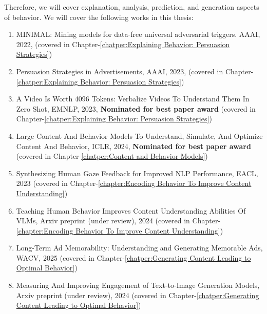 Therefore, we will cover explanation, analysis, prediction, and generation aspects of behavior. We will cover the following works in this thesis:
\begin{enumerate}
    \item MINIMAL: Mining models for data-free universal adversarial triggers. AAAI, 2022, (covered in Chapter-\ref{chatper:Explaining Behavior: Persuasion Strategies})

    \item Persuasion Strategies in Advertisements, AAAI, 2023, (covered in Chapter-\ref{chatper:Explaining Behavior: Persuasion Strategies})

    \item A Video Is Worth 4096 Tokens: Verbalize Videos To Understand Them In Zero Shot, EMNLP, 2023, \textbf{Nominated for best paper award} (covered in Chapter-\ref{chatper:Explaining Behavior: Persuasion Strategies})

    \item Large Content And Behavior Models To Understand, Simulate, And Optimize Content And Behavior, ICLR, 2024, \textbf{Nominated for best paper award} (covered in Chapter-\ref{chatper:Content and Behavior Models})
    
    \item Synthesizing Human Gaze Feedback for Improved NLP Performance, EACL, 2023 (covered in Chapter-\ref{chapter:Encoding Behavior To Improve Content Understanding})

    \item Teaching Human Behavior Improves Content Understanding Abilities Of VLMs, Arxiv preprint (under review), 2024 (covered in Chapter-\ref{chapter:Encoding Behavior To Improve Content Understanding})

    \item Long-Term Ad Memorability: Understanding and Generating Memorable Ads, WACV, 2025 (covered in Chapter-\ref{chatper:Generating Content Leading to Optimal Behavior})

    \item Measuring And Improving Engagement of Text-to-Image Generation Models, Arxiv preprint (under review), 2024 (covered in Chapter-\ref{chatper:Generating Content Leading to Optimal Behavior})
\end{enumerate}




